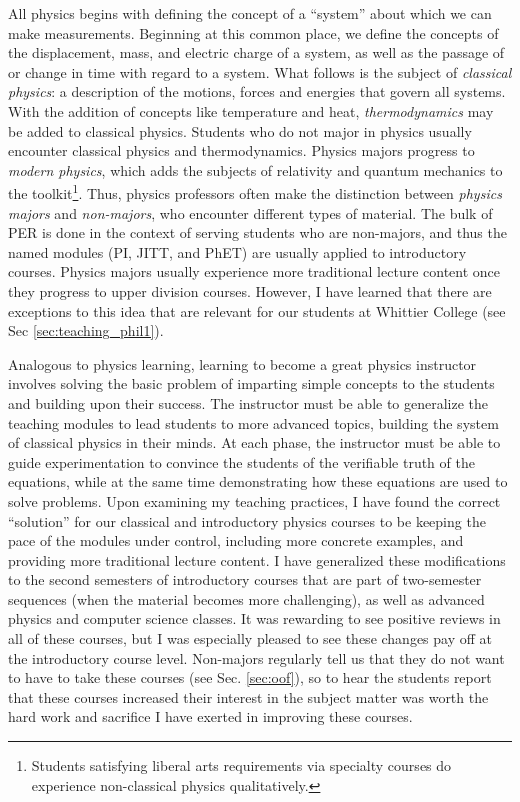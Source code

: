 \documentclass[../../main.tex]{subfiles}
\begin{document}
All physics begins with defining the concept of a ``system'' about which we can make measurements.  Beginning at this common place, we define the concepts of the displacement, mass, and electric charge of a system, as well as the passage of or change in time with regard to a system.  What follows is the subject of \textit{classical physics}: a description of the motions, forces and energies that govern all systems.  With the addition of concepts like temperature and heat, \textit{thermodynamics} may be added to classical physics.  Students who do not major in physics usually encounter classical physics and thermodynamics.  Physics majors progress to \textit{modern physics}, which adds the subjects of relativity and quantum mechanics to the toolkit\footnote{Students satisfying liberal arts requirements via specialty courses do experience non-classical physics qualitatively.}.  Thus, physics professors often make the distinction between \textit{physics majors} and \textit{non-majors}, who encounter different types of material.  The bulk of PER is done in the context of serving students who are non-majors, and thus the named modules (PI, JITT, and PhET) are usually applied to introductory courses.  Physics majors usually experience more traditional lecture content once they progress to upper division courses.  However, I have learned that there are exceptions to this idea that are relevant for our students at Whittier College (see Sec \ref{sec:teaching_phil1}). \\ \hspace{0.1cm}

Analogous to physics learning, learning to become a great physics instructor involves solving the basic problem of imparting simple concepts to the students and building upon their success.  The instructor must be able to generalize the teaching modules to lead students to more advanced topics, building the system of classical physics in their minds.  At each phase, the instructor must be able to guide experimentation to convince the students of the verifiable truth of the equations, while at the same time demonstrating how these equations are used to solve problems.  Upon examining my teaching practices, I have found the correct ``solution'' for our classical and introductory physics courses to be keeping the pace of the modules under control, including more concrete examples, and providing more traditional lecture content.  I have generalized these modifications to the second semesters of introductory courses that are part of two-semester sequences (when the material becomes more challenging), as well as advanced physics and computer science classes.  It was rewarding to see positive reviews in all of these courses, but I was especially pleased to see these changes pay off at the introductory course level.  Non-majors regularly tell us that they do not want to have to take these courses (see Sec. \ref{sec:oof}), so to hear the students report that these courses increased their interest in the subject matter was worth the hard work and sacrifice I have exerted in improving these courses.
\end{document}
